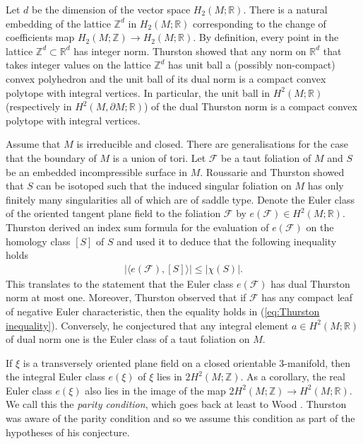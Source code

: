 \documentclass[11pt]{amsart}
\theoremstyle{remark}
\theoremstyle{definition}
\begin{document}
	Let $d$ be the dimension of the vector space $H_2(M ; \mathbb{R})$. There is a natural embedding of the lattice $\mathbb{Z}^d$ in $H_2(M ; \mathbb{R})$ corresponding to the change of coefficients map $H_2(M ; \mathbb{Z}) \rightarrow H_2(M ; \mathbb{R})$. By definition, every point in the lattice $\mathbb{Z}^d \subset \mathbb{R}^d$ has integer norm. Thurston \cite{thurston1986norm} showed that any norm on $\mathbb{R}^d$ that takes integer values on the lattice $\mathbb{Z}^d$ has unit ball a (possibly non-compact) convex polyhedron and the unit ball of its dual norm is a compact convex polytope with integral vertices. In particular, the unit ball in $H^2(M ; \mathbb{R})$ (respectively in $H^2(M , \partial M ; \mathbb{R})$) of the dual Thurston norm is a compact convex polytope with integral vertices.
	
	Assume that $M$ is irreducible and closed. There are generalisations for the case that the boundary of $M$ is a union of tori. Let $\mathcal{F}$ be a taut foliation of $M$ and $S$ be an embedded incompressible surface in $M$. Roussarie \cite{roussarie1974plongements} and Thurston \cite{thurston1972foliations,thurston1986norm} showed that $S$ can be isotoped such that the induced singular foliation on $M$ has only finitely many singularities all of which are of saddle type. Denote the Euler class of the oriented tangent plane field to the foliation $\mathcal{F}$ by $e(\mathcal{F}) \in H^2(M ; \mathbb{R})$. Thurston derived an index sum formula for the evaluation of $e(\mathcal{F})$ on the homology class $[S]$ of $S$ and used it to deduce that the following inequality holds
	\begin{eqnarray}
		|\langle e(\mathcal{F}), [S] \rangle | \leq |\chi(S)|.
		\label{eq:Thurston inequality}
	\end{eqnarray}  
	This translates to the statement that the Euler class $e(\mathcal{F})$ has dual Thurston norm at most one. Moreover, Thurston observed that if $\mathcal{F}$ has any compact leaf of negative Euler characteristic, then the equality holds in (\ref{eq:Thurston inequality}). Conversely, he conjectured \cite[p. 129, Conjecture 3]{thurston1986norm} that any integral element $a \in H^2(M ; \mathbb{R})$ of dual norm one is the Euler class of a taut foliation on $M$. 
	
	If $\xi$ is a transversely oriented plane field on a closed orientable 3-manifold, then the integral Euler class $e(\xi)$ of $\xi$ lies in $2 H^2(M ; \mathbb{Z})$. As a corollary, the real Euler class $e(\xi)$ also lies in the image of the map $2 H^2(M ; \mathbb{Z}) \rightarrow H^2(M ; \mathbb{R})$. We call this the \emph{parity condition}, which goes back at least to Wood \cite{wood1969foliations}. Thurston was aware of the parity condition and so we assume this condition as part of the hypotheses of his conjecture. 
	
\end{document}
